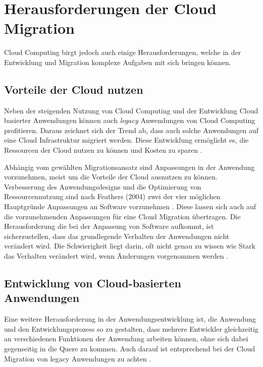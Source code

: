 \section{Herausforderungen der Cloud Migration}
\label{sec:herausforderungen}


Cloud Computing birgt jedoch auch einige Herausforderungen, welche in der Entwicklung und Migration komplexe Aufgaben mit sich bringen können.

\subsection{Vorteile der Cloud nutzen}

Neben der steigenden Nutzung von Cloud Computing und der Entwicklung Cloud basierter Anwendungen können auch \textit{legacy} Anwendungen von Cloud Computing profitieren. Daraus zeichnet sich der Trend ab, dass auch solche Anwendungen auf eine Cloud Infrastruktur migriert werden. Diese Entwicklung ermöglicht es, die Ressourcen der Cloud nutzen zu können und Kosten zu sparen \cite[Vgl.][S. 31]{Maenhaut2016}.

Abhängig vom gewählten Migrationsansatz sind Anpassungen in der Anwendung vorzunehmen, meist um die Vorteile der Cloud ausnutzen zu können. Verbesserung des Anwendungsdesigns und die Optimierung von Ressourcennutzung sind nach Feathers (2004) zwei der vier möglichen Hauptgründe Anpassungen an Software vorzunehmen \cite[Vgl.][S. 3]{Feathers2004}. Diese lassen sich auch auf die vorzunehmenden Anpassungen für eine Cloud Migration übertragen. Die Herausforderung die bei der Anpassung von Software aufkommt, ist sicherzustellen, dass das grundlegende Verhalten der Anwendungen nicht verändert wird. Die Schwierigkeit liegt darin, oft nicht genau zu wissen wie Stark das Verhalten verändert wird, wenn Änderungen vorgenommen werden \cite[Vgl.][S. 7]{Feathers2004}. 

\subsection{Entwicklung von Cloud-basierten Anwendungen}

Eine weitere Herausforderung in der Anwendungsentwicklung ist, die Anwendung und den Entwicklungsprozess so zu gestalten, dass mehrere Entwickler gleichzeitig an verschiedenen Funktionen der Anwendung arbeiten können, ohne sich dabei gegenseitig in die Quere zu kommen. Auch darauf ist entsprechend bei der Cloud Migration von legacy Anwendungen zu achten \cite[Vgl.][]{Ibryam2021}.

